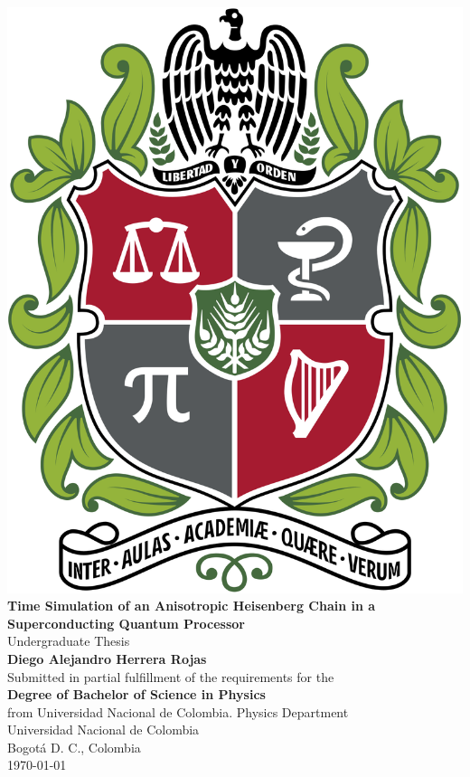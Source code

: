 \begin{titlepage}
  \begin{center}
    \vspace*{1cm}
    \includegraphics[scale=0.1]{images/EscudoUnal.png}\\
    \vspace*{1cm}
    \huge
    \textbf{Time Simulation of an Anisotropic Heisenberg Chain in a Superconducting Quantum Processor}\\
    \vspace{0.5cm}
    \LARGE
    Undergraduate Thesis\\
    \vspace{1.5cm}
    \textbf{Diego Alejandro Herrera Rojas}\\
    \vfill
    \normalsize
    Submitted in partial fulfillment of the requirements for the\\
    \textbf{Degree of Bachelor of Science in Physics}\\
    from Universidad Nacional de Colombia.
    \vfill
    \large
    Physics Department\\
    Universidad Nacional de Colombia\\
    Bogotá D. C., Colombia\\
    \yeardate\today
  \end{center}
\end{titlepage}
